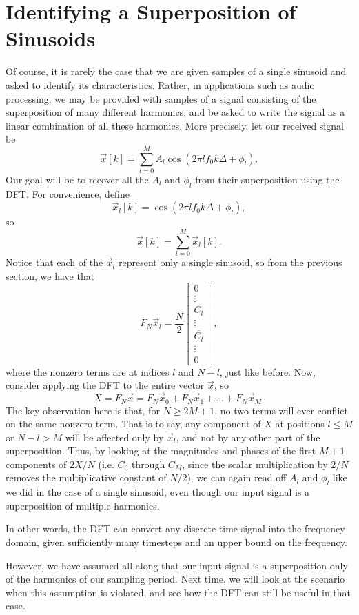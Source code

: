 \documentclass[letterpaper]{article}
\theoremstyle{remark}
\newcommand{\mat}[1]{\ensuremath{\begin{bmatrix}#1\end{bmatrix}}}
\begin{document}
\section{Identifying a Superposition of Sinusoids}
Of course, it is rarely the case that we are given samples of a single sinusoid and asked to identify its characteristics. Rather, in applications such as audio processing, we may be provided with samples of a signal consisting of the superposition of many different harmonics, and be asked to write the signal as a linear combination of all these harmonics. More precisely, let our received signal be
\[
    \vec{x}[k] = \sum_{l=0}^M A_l \cos(2\pi lf_0 k\Delta + \phi_l).
\]
Our goal will be to recover all the $A_l$ and $\phi_l$ from their superposition using the DFT. For convenience, define
\[
    \vec{x}_l[k] = \cos(2\pi lf_0 k\Delta + \phi_l),
\]
so
\[
    \vec{x}[k] = \sum_{l=0}^M \vec{x}_l[k].
\]
Notice that each of the $\vec{x}_l$ represent only a single sinusoid, so from the previous section, we have that
\[
    F_N \vec{x}_l = \frac{N}{2} \mat{0 \\ \vdots \\ C_l \\ \vdots \\ \overline{C_l} \\ \vdots \\ 0},
\]
where the nonzero terms are at indices $l$ and $N-l$, just like before. Now, consider applying the DFT to the entire vector $\vec{x}$, so
\[
    X = F_N \vec{x} = F_N \vec{x}_0 + F_N\vec{x}_1 + \ldots + F_N\vec{x}_M.
\]
The key observation here is that, for $N \ge 2M + 1$, no two terms will ever conflict on the same nonzero term. That is to say, any component of $X$ at positions $l \le M$ or $N - l > M$ will be affected only by $\vec{x}_l$, and not by any other part of the superposition. Thus, by looking at the magnitudes and phases of the first $M + 1$ components of $2X / N$ (i.e. $C_0$ through $C_M$, since the scalar multiplication by $2 / N$ removes the multiplicative constant of $N / 2$), we can again read off $A_l$ and $\phi_l$ like we did in the case of a single sinusoid, even though our input signal is a superposition of multiple harmonics.

In other words, the DFT can convert any discrete-time signal into the frequency domain, given sufficiently many timesteps and an upper bound on the frequency. 

However, we have assumed all along that our input signal is a superposition only of the harmonics of our sampling period. Next time, we will look at the scenario when this assumption is violated, and see how the DFT can still be useful in that case.
\end{document}
